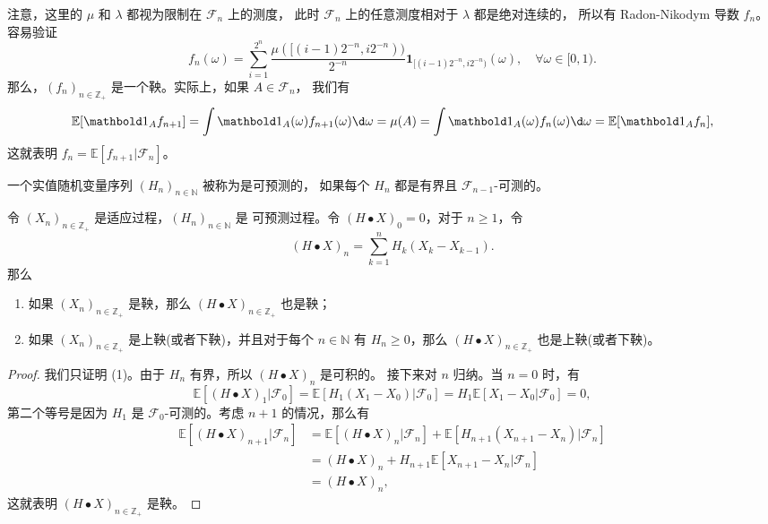 \documentclass[fontset=none]{Notes}
\newcommand{\idf}{\mathbold 1}
\begin{document}
\begin{example}
\begin{enumerate}
\[    \]
    注意，这里的 $\mu$ 和 $\lambda$ 都视为限制在 $\mathcal{F}_n$ 上的测度，
    此时 $\mathcal{F}_n$ 上的任意测度相对于 $\lambda$ 都是绝对连续的，
    所以有 Radon-Nikodym 导数 $f_n$。容易验证
    \[
      f_n(\omega)=\sum_{i=1}^{2^n}\frac{\mu([(i-1)2^{-n},i2^{-n}))}{2^{-n}}
      \idf_{[(i-1)2^{-n},i2^{-n})}(\omega),\quad \forall \omega\in [0,1).
    \]
    那么，$(f_n)_{n\in \mathbb{Z}_+}$ 是一个鞅。实际上，如果 $A\in \mathcal{F}_n$，
    我们有
    \[
      \mathbb{E}[\idf_A f_{n+1}]=\int \idf_A(\omega)f_{n+1}(\omega)\d\omega
      =\mu(A)=\int \idf_A(\omega)f_n(\omega)\d\omega =\mathbb{E}[\idf_A f_n],
    \]
    这就表明 $f_n=\mathbb{E}[f_{n+1}|\mathcal{F}_n]$。
  \end{enumerate}
\end{example}

\begin{definition}
  一个实值随机变量序列 $(H_n)_{n\in \mathbb{N}}$ 被称为是可预测的，
  如果每个 $H_n$ 都是有界且 $\mathcal{F}_{n-1}$-可测的。
\end{definition}

\begin{proposition}\label{prop:martingale transform}
  令 $(X_n)_{n\in \mathbb{Z}_+}$ 是适应过程，$(H_n)_{n\in \mathbb{N}}$ 是
  可预测过程。令 $(H \bullet X)_0=0$，对于 $n\geq 1$，令
  \[
    (H \bullet X)_n=\sum_{k=1}^n H_k (X_k - X_{k-1}).
  \]
  那么 
  \begin{enumerate}
    \item 如果 $(X_n)_{n\in \mathbb{Z}_+}$ 是鞅，那么 $(H \bullet X)_{n\in \mathbb{Z}_+}$ 也是鞅；
    \item 如果 $(X_n)_{n\in \mathbb{Z}_+}$ 是上鞅(或者下鞅)，并且对于每个 $n\in \mathbb{N}$
    有 $H_n\geq 0$，那么 $(H \bullet X)_{n\in \mathbb{Z}_+}$ 也是上鞅(或者下鞅)。
  \end{enumerate}
\end{proposition}
\begin{proof}
  我们只证明 (1)。由于 $H_n$ 有界，所以 $(H \bullet X)_n$ 是可积的。
  接下来对 $n$ 归纳。当 $n=0$ 时，有
  \[ 
    \mathbb{E}[(H\bullet X)_1|\mathcal{F}_0]=\mathbb{E}[H_1(X_1-X_0)|\mathcal{F}_0]
    =H_1 \mathbb{E}[X_1-X_0|\mathcal{F}_0]=0,
  \]
  第二个等号是因为 $H_1$ 是 $\mathcal{F}_0$-可测的。考虑 $n+1$
  的情况，那么有
  \begin{align*}
        \mathbb{E}[(H\bullet X)_{n+1}| \mathcal{F}_n]&=
    \mathbb{E}[(H\bullet X)_n|\mathcal{F}_{n}]+\mathbb{E}[H_{n+1}(X_{n+1}-X_n)|\mathcal{F}_n]\\
    &=(H\bullet X)_n+H_{n+1}\mathbb{E}[X_{n+1}-X_n|\mathcal{F}_n]\\
    &=(H\bullet X)_n,
  \end{align*}
  这就表明 $(H\bullet X)_{n\in \mathbb{Z}_+}$ 是鞅。
\end{proof}
\end{document}
